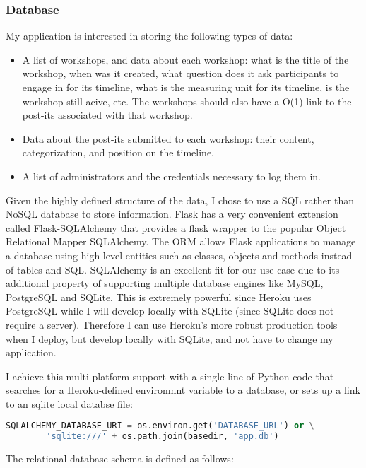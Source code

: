 \documentclass[12pt] {article}
\begin{document}
\subsubsection{Database}

My application is interested in storing the following types of data: 
\begin{itemize}
    \item A list of workshops, and data about each workshop: what is the title of the workshop, when was it created, what question does it ask participants to engage in for its timeline, what is the measuring unit for its timeline, is the workshop still acive, etc. The workshops should also have a O(1) link to the post-its associated with that workshop.
    \item Data about the post-its submitted to each workshop: their content, categorization, and position on the timeline.
    \item A list of administrators and the credentials necessary to log them in.
\end{itemize}

Given the highly defined structure of the data, I chose to use a SQL rather than NoSQL database to store information. Flask has a very convenient extension called Flask-SQLAlchemy that provides a flask wrapper to the popular Object Relational Mapper SQLAlchemy. The ORM allows Flask applications to manage a database using high-level entities such as classes, objects and methods instead of tables and SQL. SQLAlchemy is an excellent fit for our use case due to its additional property of supporting multiple database engines like MySQL, PostgreSQL and SQLite. This is extremely powerful since Heroku uses PostgreSQL while I will develop locally with SQLite (since SQLite does not require a server). Therefore I can use Heroku's more robust production tools when I deploy, but develop locally with SQLite, and not have to change my application.

I achieve this multi-platform support with a single line of Python code that searches for a Heroku-defined environmnt variable to a database, or sets up a link to an sqlite local databse file:
\begin{lstlisting}[language=Python]
    SQLALCHEMY_DATABASE_URI = os.environ.get('DATABASE_URL') or \
        'sqlite:///' + os.path.join(basedir, 'app.db')
\end{lstlisting}

The relational database schema is defined as follows: \\\\
\end{document}
